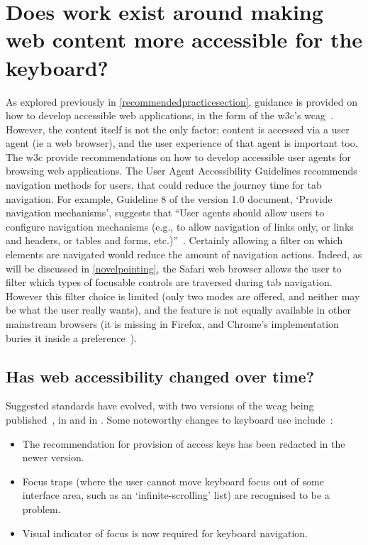 \documentclass[11pt,openright,a4paper]{report}
\begin{document}
\section{Does work exist around making web content more accessible for the keyboard?}
\label{makingwebcontentkeyboardaccessible}
As explored previously in \cref{recommendedpracticesection}, guidance is provided on how to develop accessible web applications, in the form of the \gls{w3c}'s \gls{wcag}~\cite{chisholm2001web,wcag}. However, the content itself is not the only factor; content is accessed via a user agent (ie a web browser), and the user experience of that agent is important too. The \gls{w3c} provide recommendations on how to develop accessible user agents for browsing web applications\cite{jacobs2000user,allan2010user}. The User Agent Accessibility Guidelines recommends navigation methods for users, that could reduce the journey time for tab navigation. For example, Guideline 8 of the version 1.0 document, `Provide navigation mechanisms', suggests that ``User agents should allow users to configure navigation mechanisms (e.g., to allow navigation of links only, or links and headers, or tables and forms, etc.)''~\parencite[][p.17]{jacobs2000user}. Certainly allowing a filter on which elements are navigated would reduce the amount of navigation actions. Indeed, as will be discussed in \cref{novelpointing}, the Safari web browser allows the user to filter which types of focusable controls are traversed during tab navigation. However this filter choice is limited (only two modes are offered, and neither may be what the user really wants), and the feature is not equally available in other mainstream browsers (it is missing in Firefox, and Chrome's implementation buries it inside a preference~\cite{browserkeyboardaccess}).
\subsection{Has web accessibility changed over time?}
Suggested standards have evolved, with two versions of the \gls{wcag} being published~\cite{chisholm2001web,wcag}, in \citeyear{chisholm2001web} and in \citeyear{wcag}. Some noteworthy changes to keyboard use include~\cite{wcagcomparison}:
\begin{itemize}
\item The recommendation for provision of access keys has been redacted in the newer version.
\item Focus traps (where the user cannot move keyboard focus out of some interface area, such as an `infinite-scrolling' list) are recognised to be a problem.
\item Visual indicator of focus is now required for keyboard navigation.
\end{itemize}
\end{document}
